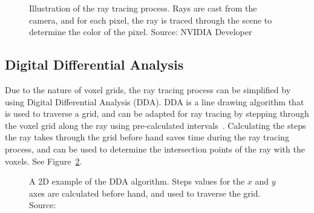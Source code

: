 \begin{figure}[thp]
    \begin{center}
    \end{center}
    \caption{Illustration of the ray tracing process. Rays are cast from the camera, and for each pixel, the ray is traced
        through the scene to determine the color of the pixel. Source: NVIDIA Developer}
    \label{fig:ray_tracing}
\end{figure}

\subsection{Digital Differential Analysis} \label{sec:dda}
Due to the nature of voxel grids, the ray tracing process can be simplified by using Digital Differential Analysis (DDA).
DDA is a line drawing algorithm that is used to traverse a grid, and can be adapted for ray tracing by stepping through the
voxel grid along the ray using pre-calculated intervals~\cite{Amanatides_Woo_1987}. Calculating the steps the ray takes
through the grid before hand saves time during the ray tracing process, and can be used to determine the intersection
points of the ray with the voxels. See Figure~\ref{fig:dda}.

\begin{figure}[thp]
    \begin{center}
    \end{center}
    \caption{A 2D example of the DDA algorithm. Steps values for the $x$ and $y$ axes are calculated before hand, and used
        to traverse the grid. Source:~\protect\cite{Xiao_2015}}
    \label{fig:dda}
\end{figure}

